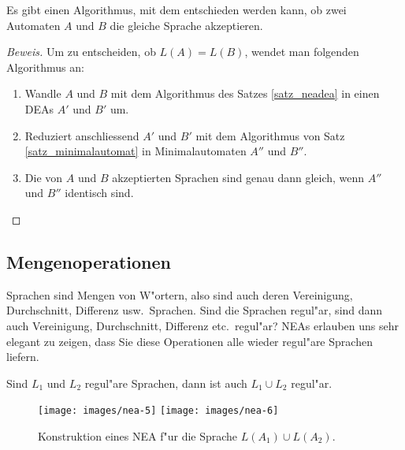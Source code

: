 \begin{satz}
Es gibt einen Algorithmus, mit dem entschieden werden kann, ob
zwei Automaten $A$ und $B$ die gleiche Sprache akzeptieren.
\end{satz}

\begin{proof}[Beweis]
Um zu entscheiden, ob $L(A)=L(B)$, wendet man folgenden Algorithmus
an:
\begin{enumerate}
\item Wandle $A$ und $B$
mit dem Algorithmus des Satzes 
\ref{satz_neadea} in einen DEAs $A'$ und $B'$ um.
\item Reduziert anschliessend $A'$ und $B'$  mit dem Algorithmus
von Satz \ref{satz_minimalautomat} in Minimalautomaten
$A''$ und $B''$.
\item Die von $A$ und $B$ akzeptierten Sprachen sind genau dann
gleich, wenn $A''$ und $B''$ identisch sind.
\end{enumerate}
\end{proof}

\subsection{Mengenoperationen\label{regulaer:mengenoperationen}}
Sprachen sind Mengen von W"ortern, also sind auch deren Vereinigung,
Durchschnitt, Differenz usw.~Sprachen. Sind die Sprachen regul"ar,
sind dann auch Vereinigung, Durchschnitt, Differenz etc.~regul"ar? 
NEAs erlauben uns sehr elegant zu zeigen, dass Sie diese Operationen
alle wieder regul"are Sprachen liefern.

\begin{satz}
\label{satz_union}
Sind $L_1$ und $L_2$ regul"are Sprachen, dann
ist auch $L_1\cup L_2$ regul"ar.
\end{satz}

\begin{figure}
\begin{center}
\texttt{[image: images/nea-5]}
\qquad
\qquad
\texttt{[image: images/nea-6]}
\end{center}
\caption{Konstruktion eines NEA 
f"ur die Sprache $L(A_1)\cup L(A_2)$.\label{regulaer:vereinigung}}
\end{figure}

